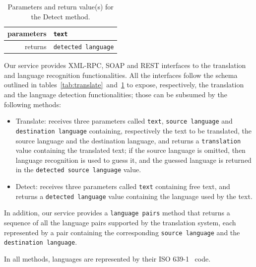 \documentclass[11pt]{article}
\begin{document}
\begin{table}[!ht]
\begin{center}
 \begin{tabular}{|r|l|}
  \hline
   parameters	& {\tt\small text} \\
  \hline \hline
   returns 	& {\tt\small detected language}\\
  \hline
 \end{tabular}
\end{center}
\caption{Parameters and return value(s) for the Detect method.}
\label{tab:detect}
\end{table}

Our service provides XML-RPC, SOAP and REST interfaces to the translation and language recognition functionalities. All the interfaces follow the schema outlined in tables~\ref{tab:translate}~and~\ref{tab:detect} to expose, respectively, the translation and the language detection functionalities; those can be subsumed by the following methods:

\begin{itemize}
 \item Translate: receives three parameters called {\tt\small text}, {\tt\small source language} and {\tt\small destination language} containing, respectively the text to be translated, the source language and the destination language, and returns a {\tt\small translation} value containing the translated text; if the source language is omitted, then language recognition is used to guess it, and the guessed language is returned in the {\tt\small detected source language} value.
 \item Detect: receives three parameters called {\tt\small text} containing free text, and returns a {\tt\small detected language} value containing the language used by the text.
\end{itemize}

In addition, our service provides a {\tt\small language pairs} method that returns a sequence of all the language pairs supported by the translation system, each represented by a pair containing the corresponding {\tt\small source language} and the {\tt\small destination language}.


In all methods, languages are represented by their ISO 639-1~\citep{ISO:639-1} code.

\end{document}
